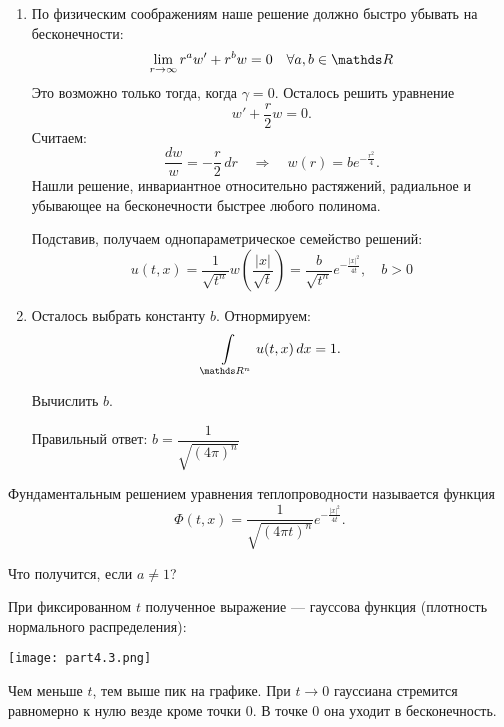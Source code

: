 \begin{enumerate}
\item По физическим соображениям наше решение должно быстро убывать на бесконечности:
$$ \lim_{r \to \infty} r^a w' + r^b w = 0 \quad \forall a ,b \in \real$$
Это возможно только тогда, когда $\gamma = 0$. Осталось решить уравнение
$$w' + \frac {r} {2} w = 0.$$
Считаем:
$$ \frac {dw} {w} = - \frac {r} {2} \, dr \quad \Rightarrow \quad w(r) = b e^ {- \frac {r^2} {4}}.$$
Нашли решение, инвариантное относительно растяжений, радиальное и убывающее на бесконечности быстрее любого полинома.

Подставив, получаем однопараметрическое семейство решений:
$$ u(t,x) = \frac {1} {\sqrt{t^n}} w \left( \frac {|x|} {\sqrt{t}} \right) = \frac {b} {\sqrt{t^n}} e^{-\frac {|x|^2} {4t} }, \quad b > 0 $$

\item Осталось выбрать константу $b$. Отнормируем:
$$ \int \limits_{\real^n} u(t,x) \, dx = 1.$$
\begin{exercise} Вычислить $b$.
\end{exercise}
Правильный ответ: $b = \dfrac {1} {\sqrt{(4\pi)^n}}$
\end{enumerate}

\begin{definition}
Фундаментальным решением уравнения теплопроводности называется функция
$$ \Phi(t, x) = \frac {1} {\sqrt{(4 \pi t)^n}} e ^ {- \frac {|x|^2} {4t}}.$$
\end{definition}

\begin{exercise}
Что получится, если $a \not= 1$?
\end{exercise}

\begin{note}
При фиксированном $t$ полученное выражение --- гауссова функция (плотность нормального распределения):

\begin{center}
\texttt{[image: part4.3.png]}
\end{center}

Чем меньше $t$, тем выше пик на графике. При $t \to 0$ гауссиана стремится равномерно к нулю везде кроме точки $0$. В точке $0$ она уходит в бесконечность.
\end{note}

